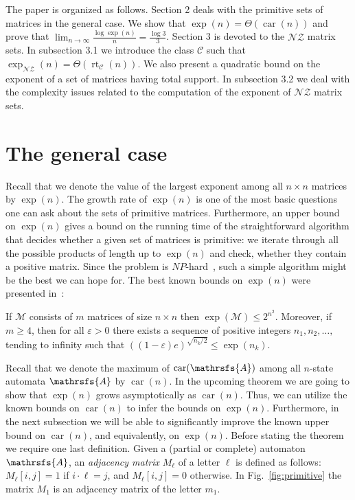\documentclass[a4paper,USenglish]{lipics}
\DeclareMathOperator{\rt}{rt}
\DeclareMathOperator{\car}{car}
\theoremstyle{definition}
\begin{document}
The paper is organized as follows. Section 2 deals with the primitive sets of matrices in the general case. We show that $\exp(n)=\Theta(\car(n))$ and prove that $\lim_{n\rightarrow\infty} \tfrac{\log \exp(n)}{n} = \tfrac{\log 3}{3}$. Section 3 is devoted to the $\mathscr{NZ}$ matrix sets. In subsection 3.1 we introduce the class $\mathscr{C}$ such that $\exp_{\mathscr{NZ}}(n) = \Theta (\rt_{\mathscr{C}}(n))$. We also present a quadratic bound on the exponent of a set of matrices having total support. In subsection 3.2 we deal with the complexity issues related to the computation of the exponent of $\mathscr{NZ}$ matrix sets.

\section{The general case}

Recall that we denote the value of the largest exponent among all $n \times n$ matrices by $\exp(n)$. The growth rate of $\exp (n)$ is one of the most basic questions one can ask about the sets of primitive matrices. Furthermore, an upper bound on $\exp(n)$ gives a bound on the running time of the straightforward algorithm that decides whether a given set of matrices is primitive: we iterate through all the possible products of length up to $\exp(n)$ and check, whether  they contain a positive matrix. Since the problem is $NP$-hard~\cite[Theorem 6]{BJO15}, such a simple algorithm might be the best we can hope for. The best known bounds on $\exp (n)$ were presented in~\cite[Theorem 10]{BJO15}:
\begin{theorem}
\label{th:expOld}
If $\mathcal{M}$ consists of $m$ matrices of size $n \times n$ then $\exp(\mathcal{M}) \leq 2^{n^2}$. Moreover, if $m \geq 4$, then for all $\varepsilon > 0$ there exists a sequence of positive integers $n_1, n_2, \ldots , $ tending to infinity such that $((1-\varepsilon)e)^{\sqrt{n_k/2}} \leq \exp (n_k)$.
\end{theorem}

Recall that we denote the maximum of $\car(\mathrsfs{A})$ among all $n$-state automata $\mathrsfs{A}$ by $\car(n)$.
In the upcoming theorem we are going to show that $\exp (n)$ grows asymptotically as $\car(n)$. Thus, we can utilize the known bounds on $\car(n)$ to infer the bounds on $\exp (n)$. Furthermore, in the next subsection we will be able to significantly improve the known upper bound on $\car(n)$, and equivalently, on $\exp(n)$. Before stating the theorem we require one last definition. Given a (partial or complete) automaton $\mathrsfs{A}$, an \emph{adjacency matrix} $M_\ell$ of a letter $\ell$ is defined as follows: $M_{\ell}[i,j]=1$ if $i \cdot \ell = j$, and $M_\ell [i,j]=0$ otherwise. In Fig.~\ref{fig:primitive} the matrix $M_1$ is an adjacency matrix of the letter $m_1$.
\end{document}
